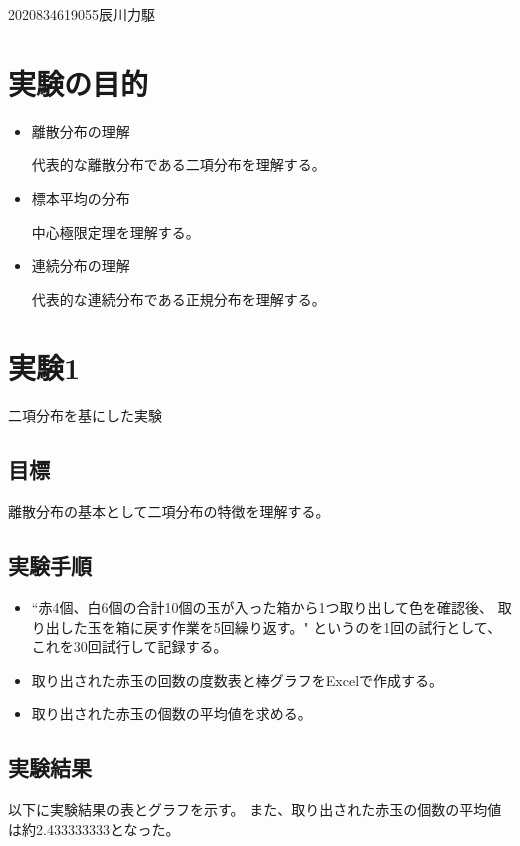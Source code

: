 \documentclass[12pt]{jarticle}
\begin{document}
{2020}{8}{3}{4619055}{辰川力駆}


\section{実験の目的}
\begin{itemize}
    \item[(1)] 離散分布の理解

          代表的な離散分布である二項分布を理解する。
    \item[(2)]標本平均の分布

          中心極限定理を理解する。
    \item[(3)] 連続分布の理解

          代表的な連続分布である正規分布を理解する。
\end{itemize}

\section{実験1}
二項分布を基にした実験

\subsection{目標}
離散分布の基本として二項分布の特徴を理解する。
\subsection{実験手順}
\begin{itemize}
    \item[(1)] ``赤4個、白6個の合計10個の玉が入った箱から1つ取り出して色を確認後、
          取り出した玉を箱に戻す作業を5回繰り返す。"
          というのを1回の試行として、これを30回試行して記録する。
    \item[(2)] 取り出された赤玉の回数の度数表と棒グラフをExcelで作成する。
    \item[(3)] 取り出された赤玉の個数の平均値を求める。
\end{itemize}
\subsection{実験結果}
以下に実験結果の表とグラフを示す。
また、取り出された赤玉の個数の平均値は約2.433333333となった。
\end{document}

